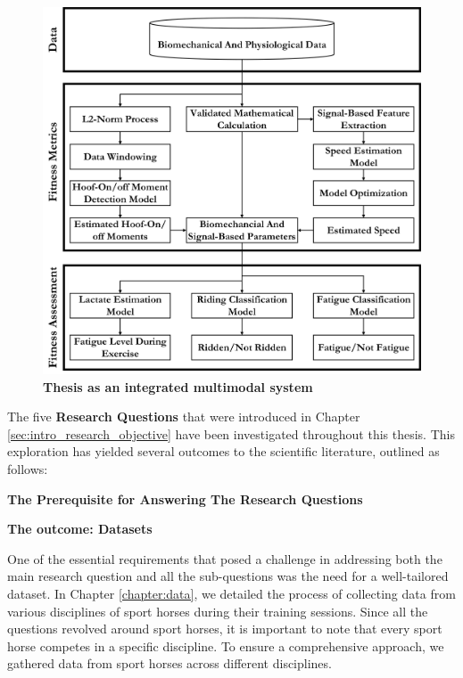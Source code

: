 \begin{figure}[!htb]
\centering
\includegraphics[width=\linewidth]{chapters/conclusions_future_work/figures/wholepic.png}
\caption{{\bf Thesis as an integrated multimodal system}}
\label{fig:wholepic}
\end{figure}

The five \textbf{Research Questions} that were introduced in Chapter \ref{sec:intro_research_objective} have been investigated throughout this thesis. This exploration has yielded several outcomes to the scientific literature, outlined as follows:

\vspace{0.3cm}

\noindent\textbf{\large The Prerequisite for Answering The Research Questions} 

\vspace{0.15cm}

\noindent\textbf{The outcome: Datasets}

One of the essential requirements that posed a challenge in addressing both the main research question and all the sub-questions was the need for a well-tailored dataset. In Chapter \ref{chapter:data}, we detailed the process of collecting data from various disciplines of sport horses during their training sessions. Since all the questions revolved around sport horses, it is important to note that every sport horse competes in a specific discipline. To ensure a comprehensive approach, we gathered data from sport horses across different disciplines.

